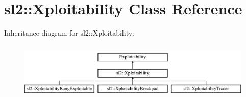 \hypertarget{classsl2_1_1_xploitability}{}\section{sl2\+:\+:Xploitability Class Reference}
\label{classsl2_1_1_xploitability}
Inheritance diagram for sl2\+:\+:Xploitability\+:\begin{figure}[H]
\begin{center}
\leavevmode
\includegraphics[height=2.842640cm]{d6/d69/classsl2_1_1_xploitability}
\end{center}
\end{figure}
